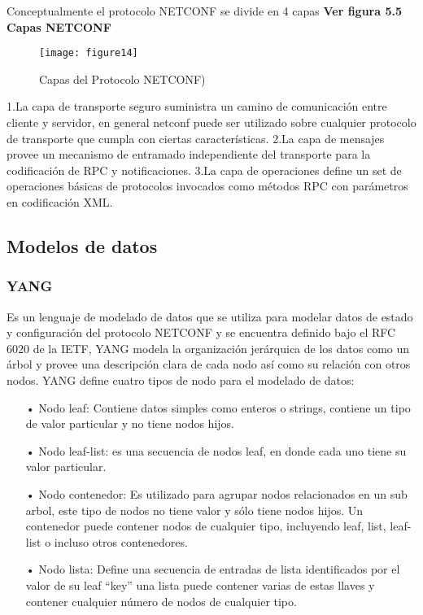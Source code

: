 Conceptualmente el protocolo NETCONF se divide en 4 capas \textbf{Ver figura 5.5 Capas NETCONF}


\begin{figure}[htbp]
  \centering
    {\texttt{[image: figure14]}}%
  \caption{Capas del Protocolo NETCONF)}
  \label{fig:fig2subfig}
\end{figure}

1.La capa de transporte seguro suministra un camino de comunicación entre cliente y servidor, en general netconf puede ser utilizado sobre cualquier protocolo de transporte que cumpla con ciertas características.
2.La capa de mensajes provee un mecanismo de entramado independiente del transporte para la codificación de RPC y notificaciones.
3.La capa de operaciones define un set de operaciones básicas de protocolos invocados como métodos RPC con parámetros en codificación XML.

\subsection{Modelos de datos}
\label{sec:Modelos de datos}

\subsubsection{YANG}
\label{sec:YANG}


Es un lenguaje de modelado de datos que se utiliza para modelar datos de estado y configuración del protocolo NETCONF y se encuentra definido bajo el RFC 6020 de la IETF, YANG modela la organización jerárquica de los datos como un árbol y provee una descripción clara de cada nodo así como su relación con otros nodos.
YANG define cuatro tipos de nodo para el modelado de datos:

\begin{itemize}
\item[•] Nodo leaf: Contiene datos simples como enteros o strings, contiene un tipo de valor particular y no tiene nodos hijos.
\item[•]Nodo leaf-list: es una secuencia de nodos leaf, en donde cada uno tiene su valor particular.
\item[•]Nodo contenedor: Es utilizado para agrupar nodos relacionados en un sub arbol, este tipo de nodos no tiene valor y sólo tiene nodos hijos. Un contenedor puede contener nodos de cualquier tipo, incluyendo leaf, list, leaf-list o incluso otros contenedores.
\item[•]Nodo lista: Define una secuencia de entradas de lista identificados por el valor de su leaf “key” una lista puede contener varias de estas llaves y contener cualquier número de nodos de cualquier tipo.

\end{itemize}

